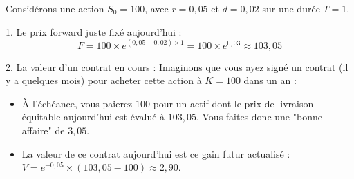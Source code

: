 \begin{examplebox}
Considérons une action $S_0 = 100$, avec $r = 0,05$ et $d = 0,02$ sur une durée $T = 1$.

1. Le prix forward juste fixé aujourd'hui :
\begin{equation*}
    F = 100 \times e^{(0,05 - 0,02) \times 1} = 100 \times e^{0,03} \approx 103,05
\end{equation*}

2. La valeur d'un contrat en cours :
Imaginons que vous ayez signé un contrat (il y a quelques mois) pour acheter cette action à $K = 100$ dans un an :
\begin{itemize}[label=$\rightarrow$]
    \item À l'échéance, vous paierez $100$ pour un actif dont le prix de livraison équitable aujourd'hui est évalué à $103,05$. Vous faites donc une "bonne affaire" de $3,05$.
    \item La valeur de ce contrat aujourd'hui est ce gain futur actualisé : 
    $V = e^{-0,05} \times (103,05 - 100) \approx 2,90$.
\end{itemize}
\end{examplebox}


